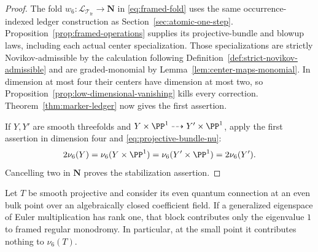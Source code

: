 \begin{proof}
The fold \(w_6:\mathcal L_{\mathcal T_{\mathrm{fr}}}\to\mathbf N\) in
\eqref{eq:framed-fold} uses the same occurrence-indexed ledger construction as
Section~\ref{sec:atomic-one-step}.  Proposition~\ref{prop:framed-operations}
supplies its projective-bundle and blowup laws, including each actual center
specialization.  Those specializations are strictly Novikov-admissible by the
calculation following Definition~\ref{def:strict-novikov-admissible} and are
graded-monomial by Lemma~\ref{lem:center-maps-monomial}.  In dimension at
most four their centers have dimension at most two, so
Proposition~\ref{prop:low-dimensional-vanishing} kills every correction.
Theorem~\ref{thm:marker-ledger} now gives the first assertion.

If \(Y,Y'\) are smooth threefolds and
\(Y\times\PP^1\dashrightarrow Y'\times\PP^1\), apply the first assertion in
dimension four and \eqref{eq:projective-bundle-nu}:
\[
 2\nu_6(Y)=\nu_6(Y\times\PP^1)
 =\nu_6(Y'\times\PP^1)=2\nu_6(Y').
\]
Cancelling two in \(\mathbf N\) proves the stabilization assertion.
\end{proof}

\begin{lemma}\label{lem:simple-euler-block}
%
%
Let $T$ be smooth projective and consider its even quantum connection at an
even bulk point over an algebraically closed coefficient field.  If a
generalized eigenspace of Euler multiplication has rank one, that block
contributes only the eigenvalue $1$ to framed regular monodromy.  In
particular, at the small point it contributes nothing to $\nu_6(T)$.
\end{lemma}

